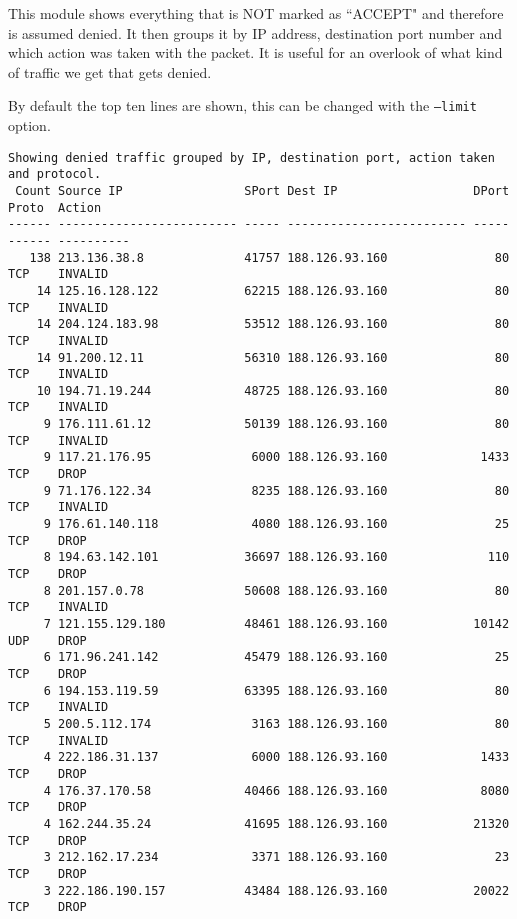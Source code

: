 \documentclass[english,twoside,openright,a4paper,12pt]{article}
\begin{document}
This module shows everything that is NOT marked as ``ACCEPT" and
therefore is assumed denied. It then groups it by IP address,
destination port number and which action was taken with the packet. It
is useful for an overlook of what kind of traffic we get that gets
denied.

By default the top ten lines are shown, this can be changed with the
\texttt{--limit} option.

\scriptsize 
\begin{verbatim}
Showing denied traffic grouped by IP, destination port, action taken and protocol.
 Count Source IP                 SPort Dest IP                   DPort Proto  Action
------ ------------------------- ----- ------------------------- ----- ------ ----------
   138 213.136.38.8              41757 188.126.93.160               80 TCP    INVALID   
    14 125.16.128.122            62215 188.126.93.160               80 TCP    INVALID   
    14 204.124.183.98            53512 188.126.93.160               80 TCP    INVALID   
    14 91.200.12.11              56310 188.126.93.160               80 TCP    INVALID   
    10 194.71.19.244             48725 188.126.93.160               80 TCP    INVALID   
     9 176.111.61.12             50139 188.126.93.160               80 TCP    INVALID   
     9 117.21.176.95              6000 188.126.93.160             1433 TCP    DROP      
     9 71.176.122.34              8235 188.126.93.160               80 TCP    INVALID   
     9 176.61.140.118             4080 188.126.93.160               25 TCP    DROP      
     8 194.63.142.101            36697 188.126.93.160              110 TCP    DROP      
     8 201.157.0.78              50608 188.126.93.160               80 TCP    INVALID   
     7 121.155.129.180           48461 188.126.93.160            10142 UDP    DROP      
     6 171.96.241.142            45479 188.126.93.160               25 TCP    DROP      
     6 194.153.119.59            63395 188.126.93.160               80 TCP    INVALID   
     5 200.5.112.174              3163 188.126.93.160               80 TCP    INVALID   
     4 222.186.31.137             6000 188.126.93.160             1433 TCP    DROP      
     4 176.37.170.58             40466 188.126.93.160             8080 TCP    DROP      
     4 162.244.35.24             41695 188.126.93.160            21320 TCP    DROP      
     3 212.162.17.234             3371 188.126.93.160               23 TCP    DROP      
     3 222.186.190.157           43484 188.126.93.160            20022 TCP    DROP  
\end{verbatim} 
\normalsize
\end{document}
